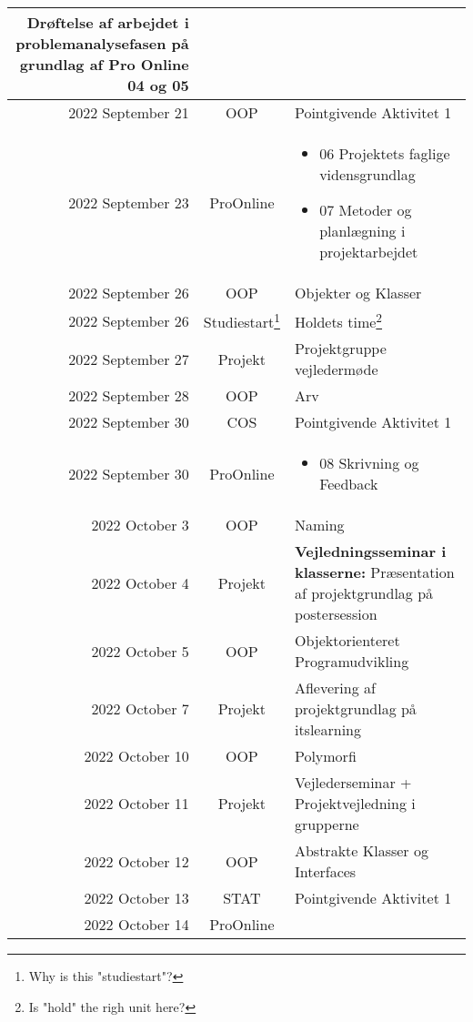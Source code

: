 \begin{longtable}{|r|c|p{}|}
\par

Drøftelse af arbejdet i problemanalysefasen  på grundlag af Pro Online 04 og 05 \\
  \hline
  \rowcolor{orange}2022 September 21 & OOP & Pointgivende Aktivitet 1 \\
  \hline
  2022 September 23 & ProOnline & \begin{itemize}[noitemsep,leftmargin=*,topsep=0pt,partopsep=0pt]

  \item 06 Projektets faglige vidensgrundlag

  \item 07 Metoder og planlægning i projektarbejdet

\end{itemize} \\
  \hline
  2022 September 26 & OOP & Objekter og Klasser \\
  \hline
  2022 September 26 & Studiestart\footnote{Why is this "studiestart"?} & Holdets time\footnote{Is "hold" the righ unit here?} \\
  \hline
  2022 September 27 & Projekt & Projektgruppe vejledermøde \\
  \hline
  2022 September 28 & OOP & Arv \\
  \hline
  \rowcolor{orange}2022 September 30 & COS & Pointgivende Aktivitet 1 \\
  \hline
  2022 September 30 & ProOnline & \begin{itemize}[noitemsep,leftmargin=*,topsep=0pt,partopsep=0pt]

  \item 08 Skrivning og Feedback

\end{itemize} \\
  \hline
  2022 October 3 & OOP & Naming \\
  \hline
  2022 October 4 & Projekt & \textbf{Vejledningsseminar i klasserne:} Præsentation af projektgrundlag på postersession \\
  \hline
  2022 October 5 & OOP & Objektorienteret Programudvikling \\
  \hline
  2022 October 7 & Projekt & Aflevering af projektgrundlag på itslearning \\
  \hline
  2022 October 10 & OOP & Polymorfi \\
  \hline
  2022 October 11 & Projekt & Vejlederseminar + Projektvejledning i grupperne \\
  \hline
  2022 October 12 & OOP & Abstrakte Klasser og Interfaces \\
  \hline
  \rowcolor{orange}2022 October 13 & STAT & Pointgivende Aktivitet 1 \\
  \hline
  2022 October 14 & ProOnline & \begin{itemize}[noitemsep,leftmargin=*,topsep=0pt,partopsep=0pt]


\end{itemize}
\end{longtable}
